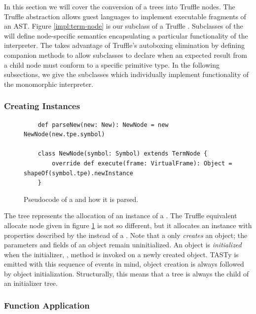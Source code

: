 In this section we will cover the conversion of a  trees into Truffle nodes.
The Truffle  abstraction allows guest languages to implement executable fragments of an AST.
Figure \ref{impl:term-node} is our subclass of a Truffle .
Subclasses of the  will define node-specific semantics encapsulating a particular functionality of the interpreter.
The  takes advantage of Truffle's autoboxing elimination by defining companion  methods to allow subclasses to declare when an expected result from a child node must conform to a specific primitive type.
In the following subsections, we give the subclasses which individually implement functionality of the monomorphic interpreter.

\subsubsection*{Creating Instances}

\begin{figure}[!htb]
	\begin{verbatim}
	def parseNew(new: New): NewNode = new NewNode(new.tpe.symbol)	
	
	class NewNode(symbol: Symbol) extends TermNode {
		override def execute(frame: VirtualFrame): Object =  shapeOf(symbol.tpe).newInstance
	}
	\end{verbatim}
	\caption{Pseudocode of a  and how it is parsed.}
	\label{impl:new-node}
\end{figure}

The  tree represents the allocation of an instance of a .
The Truffle equivalent allocate node given in figure \ref{impl:new-node} is not so different, but it allocates an instance with properties described by the  instead of a .
Note that a  only \textit{creates} an object; the parameters and fields of an object remain uninitialized.
An object is \textit{initialized} when the initializer, , method is invoked on a newly created object.
TASTy is emitted with this sequence of events in mind, object creation is always followed by object initialization.
Structurally, this means that a  tree is always the child of an initializer  tree.

\subsubsection*{Function Application}
\label{impl:subsection:apply}

